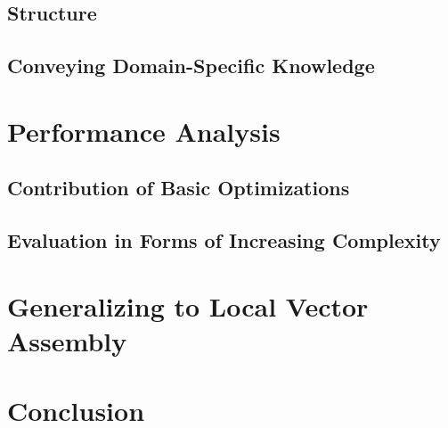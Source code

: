 \subsection{Structure}
\subsection{Conveying Domain-Specific Knowledge}

\section{Performance Analysis}
\subsection{Contribution of Basic Optimizations}
\subsection{Evaluation in Forms of Increasing Complexity}

\section{Generalizing to Local Vector Assembly}

\section{Conclusion}